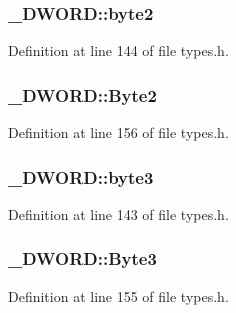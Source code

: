 \subsubsection[{\texorpdfstring{byte2}{byte2}}]{ \+\_\+\+D\+W\+O\+R\+D\+::byte2}\hypertarget{union___d_w_o_r_d_abdb31d858ae45065544ffaf444ab0de3}{}\label{union___d_w_o_r_d_abdb31d858ae45065544ffaf444ab0de3}


Definition at line 144 of file types.\+h.

\subsubsection[{\texorpdfstring{Byte2}{Byte2}}]{ \+\_\+\+D\+W\+O\+R\+D\+::\+Byte2}\hypertarget{union___d_w_o_r_d_abc386cf90e4596d6ce5f50d808ff5ae3}{}\label{union___d_w_o_r_d_abc386cf90e4596d6ce5f50d808ff5ae3}


Definition at line 156 of file types.\+h.

\subsubsection[{\texorpdfstring{byte3}{byte3}}]{ \+\_\+\+D\+W\+O\+R\+D\+::byte3}\hypertarget{union___d_w_o_r_d_a8e3a8ca76e9d95d704ccdda0899dc2c5}{}\label{union___d_w_o_r_d_a8e3a8ca76e9d95d704ccdda0899dc2c5}


Definition at line 143 of file types.\+h.

\subsubsection[{\texorpdfstring{Byte3}{Byte3}}]{ \+\_\+\+D\+W\+O\+R\+D\+::\+Byte3}\hypertarget{union___d_w_o_r_d_a4d8de410bf31d0c6b8b10d2a8061c1d1}{}\label{union___d_w_o_r_d_a4d8de410bf31d0c6b8b10d2a8061c1d1}


Definition at line 155 of file types.\+h.

